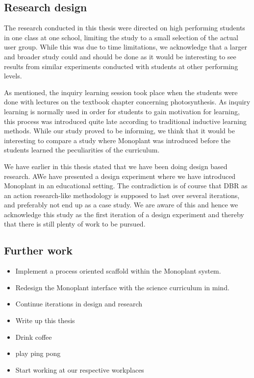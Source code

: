 \subsection{Research design}
The research conducted in this thesis were directed on high performing students in one class at one school, limiting the study to a small selection of the actual user group. While this was due to time limitations, we acknowledge that a larger and broader study could and should be done as it would be interesting to see results from similar experiments conducted with students at other performing levels.

As mentioned, the inquiry learning session took place when the students were done with lectures on the textbook chapter concerning photosynthesis. As inquiry learning is normally used in order for students to gain motivation for learning, this process was introduced quite late according to traditional inductive learning methods. While our study proved to be informing, we think that it would be interesting to compare a study where Monoplant was introduced before the students learned the peculiarities of the curriculum.

We have earlier in this thesis stated that we have been doing design based research. AWe have presented a design experiment where we have introduced Monoplant in an educational setting. The contradiction is of course that DBR as an action research-like methodology is supposed to last over several iterations, and preferably not end up as a case study. We are aware of this and hence we acknowledge this study as the first iteration of a design experiment and thereby that there is still plenty of work to be pursued.

\subsection{Further work}

\begin{itemize}
\item{Implement a process oriented scaffold within the Monoplant system.}
\item{Redesign the Monoplant interface with the science curriculum in mind.}
\item{Continue iterations in design and research}
\item{Write up this thesis}
\item{Drink coffee}
\item{play ping pong}
\item{Start working at our respective workplaces}
\end{itemize}